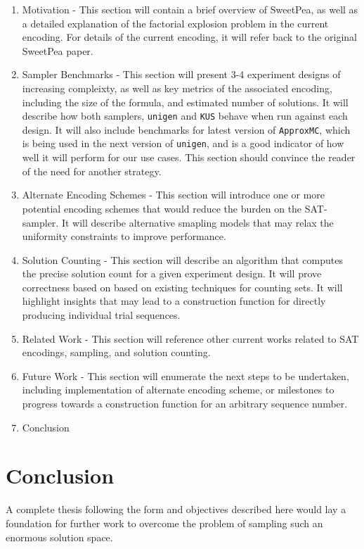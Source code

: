 \documentclass[a4paper]{article}
\begin{document}
\begin{enumerate}
\item Motivation - This section will contain a brief overview of SweetPea, as well as a detailed explanation of the factorial explosion problem in the current encoding. For details of the current encoding, it will refer back to the original SweetPea paper.
\item Sampler Benchmarks - This section will present 3-4 experiment designs of increasing compleixty, as well as key metrics of the associated encoding, including the size of the formula, and estimated number of solutions. It will describe how both samplers, \texttt{unigen} and \texttt{KUS} behave when run against each design. It will also include benchmarks for latest version of \texttt{ApproxMC}, which is being used in the next version of \texttt{unigen}, and is a good indicator of how well it will perform for our use cases. This section should convince the reader of the need for another strategy.
\item Alternate Encoding Schemes - This section will introduce one or more potential encoding schemes that would reduce the burden on the SAT-sampler. It will describe alternative smapling models that may relax the uniformity constraints to improve performance.
\item Solution Counting - This section will describe an algorithm that computes the precise solution count for a given experiment design. It will prove correctness based on based on existing techniques for counting sets. It will highlight insights that may lead to a construction function for directly producing individual trial sequences.
\item Related Work - This section will reference other current works related to SAT encodings, sampling, and solution counting.
\item Future Work - This section will enumerate the next steps to be undertaken, including implementation of alternate encoding scheme, or milestones to progress towards a construction function for an arbitrary sequence number.
\item Conclusion
\end{enumerate}


\section*{Conclusion}

A complete thesis following the form and objectives described here would lay a foundation for further work to overcome the problem of sampling such an enormous solution space.
\end{document}
